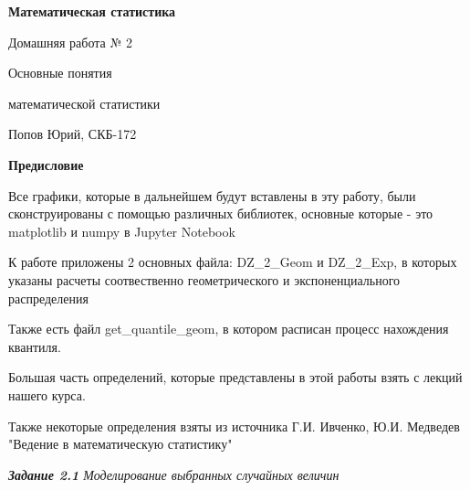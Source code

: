 \documentclass[a4paper,12pt, oneside]{book}
\begin{document}
	\pagestyle{plain}
	
	\begin{titlepage}	
		\begin{center}
			{\Huge \textbf{Математическая статистика}}
			\vspace{30mm}
			
			{\Huge Домашняя работа № 2 \\}
			\vspace{30mm}
			
			{\huge Основные понятия 
				
				математической статистики}
			\vspace{30mm}
			
			{\Large Попов Юрий, СКБ-172}
		\end{center}
	\end{titlepage}
	
	
	
	\begin{spacing}{0.99}          
		\tableofcontents %
	\end{spacing}

\newpage
\begin{center}
	{\Huge{\bf{Предисловие}}}
\end{center}

\vspace{5mm}
Все графики, которые в дальнейшем будут вставлены в эту работу, были сконструированы с помощью различных библиотек, основные которые - это matplotlib  и numpy в Jupyter Notebook

К работе приложены 2 основных файла: DZ\_2\_Geom и DZ\_2\_Exp, в которых указаны расчеты  соотвественно геометрического и  экспоненциального распределения

Также есть файл get\_quantile\_geom, в котором расписан процесс нахождения квантиля.
\vspace{5mm}

Большая часть определений, которые представлены в этой работы взять с лекций нашего курса. 
\vspace{5mm}

Также некоторые определения взяты из источника   Г.И. Ивченко, Ю.И. Медведев \\
"Ведение в математическую статистику"

 
\newpage
{\large\textit{\textbf{Задание 2.1} Моделирование выбранных случайных величин}}
\end{document}
